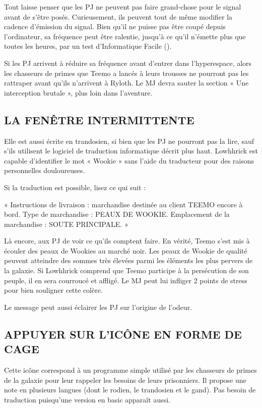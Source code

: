 \documentclass[a4paper,10pt,twoside,twocolumn,openany]{book}
\begin{document}
Tout laisse penser que les PJ ne peuvent pas faire
grand-chose pour le signal avant de s’être posés. Curieusement, ils peuvent tout de même modifier la cadence
d’émission du signal. Bien qu'il ne puisse pas être coupé depuis l’ordinateur, sa fréquence peut être ralentie, jusqu’à ce qu’il n’émette plus que toutes les heures, par
un test d’Informatique Facile (\difficulty).

Si les PJ arrivent à réduire sa fréquence avant d’entrer dans l’hyperespace, alors les chasseurs de primes
que Teemo a lancés à leurs trousses ne pourront pas les
rattraper avant qu’ils n’arrivent à Ryloth. Le MJ devra
sauter la section « Une interception brutale », plus loin
dans l’aventure.

\subsection{LA FENÊTRE INTERMITTENTE}

Elle est aussi écrite en trandosien, si bien que les PJ
ne pourront pas la lire, sauf s’ils utilisent le logiciel de
traduction informatique décrit plus haut. Lowhhrick est
capable d’identifier le mot « Wookie » sans l’aide du traducteur pour des raisons personnelles douloureuses.

Si la traduction est possible, lisez ce qui suit :
\begin{quotebox}
« Instructions de livraison : marchandise destinée
au client TEEMO encore à bord. Type de marchandise : PEAUX DE WOOKIE. Emplacement de la
marchandise : SOUTE PRINCIPALE. »
\end{quotebox}

 Là encore, aux PJ de voir ce qu’ils comptent faire. En
vérité, Teemo s’est mis à écouler des peaux de Wookies
au marché noir. Les peaux de Wookie de qualité peuvent
atteindre des sommes très élevées parmi les éléments
les plus pervers de la galaxie. Si Lowhhrick comprend
que Teemo participe à la persécution de son peuple, il en
sera courroucé et affligé. Le MJ peut lui infliger 2 points
de stress pour bien souligner cette colère.

Le message peut aussi éclairer les PJ sur l’origine de
l’odeur.

\subsection{APPUYER SUR L’ICÔNE EN FORME DE CAGE}

Cette icône correspond à un programme simple utilisé par les chasseurs de primes de la galaxie pour leur
rappeler les besoins de leurs prisonniers. Il propose une
note en plusieurs langues (dont le rodien, le trandosien
et le gand). Pas besoin de traduction puisqu’une version
en basic apparaît aussi.
\end{document}
